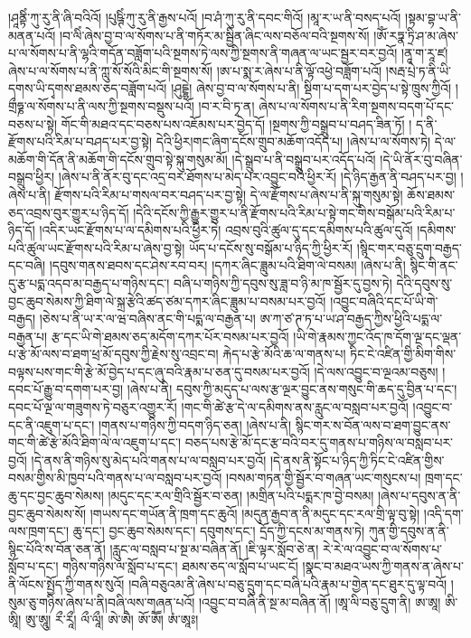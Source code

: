 །ཤཱནྟིཾ་ཀུ་རུ་ནི་ཞི་བའིའོ། །པུཥྚིཾ་ཀུ་རུ་ནི་རྒྱས་པའོ། །བ་ཤཾ་ཀུ་རུ་ནི་དབང་གིའོ། །མཱ་ར་ཡ་ནི་བསད་པའོ། །སྟམ་བྷ་ཡ་ནི་མནན་པའོ། །བ་ལིཾ་ཞེས་བྱ་བ་ལ་སོགས་པ་ནི་གཏོར་མ་སྦྱིན་ཞིང་ལས་བཅོལ་བའི་སྔགས་སོ། །ཨོཾ་རཏྣ་ཏྲི་ཤ་མ་ཞེས་པ་ལ་སོགས་པ་ནི་ལྷའི་གདོན་བཟློག་པའི་སྔགས་ཏེ་ལས་ཀྱི་སྔགས་ནི་གཞན་ལ་ཡང་སྦྱར་བར་བྱའོ། །ནཱ་ག་རཱ་ཛ། ཞེས་པ་ལ་སོགས་པ་ནི་ཀླུ་སོ་སོའི་མིང་གི་སྔགས་སོ། །ཨ་པ་སྨ་ར་ཞེས་པ་ནི་ལྟོ་འཕྱེ་བཟློག་པའོ། །སརྦ་པྲེ་ཏ་ནི་{ཡི་དགས་ཡི་དྭགས་}ཐམས་ཅད་བཟློག་པའོ། །ཤུདྔྷེ། ཞེས་བྱ་བ་ལ་སོགས་པ་ནི། སྡིག་པ་དག་པར་བྱེད་པ་སྟེ་ཁྲུས་ཀྱིའོ། །གྲྀཧྞ་ལ་སོགས་པ་ནི་ལས་ཀྱི་སྔགས་བསྡུས་པའོ། །བ་ར་བི་ཏྭ་ན། ཞེས་པ་ལ་སོགས་པ་ནི་རིག་སྔགས་བདག་པོ་དང་བཅས་པ་སྟེ། གོང་གི་མཐའ་དང་བཅས་པས་འཇོམས་པར་བྱེད་དོ། །སྔགས་ཀྱི་བསྒྲུབ་པ་བཤད་ཟིན་ཏོ། །
ད་ནི་རྫོགས་པའི་རིམ་པ་བཤད་པར་བྱ་སྟེ། དེའི་ཕྱིར།གང་ཞིག་དངོས་གྲུབ་མཆོག་འདོད་པ། །ཞེས་པ་ལ་སོགས་ཏེ། དེ་ལ་མཆོག་གི་དོན་ནི་མཆོག་གི་དངོས་གྲུབ་སྟེ་སྐུ་གསུམ་མོ། །དེ་སྒྲུབ་པ་ནི་བསྒྲུབ་པར་འདོད་པའོ། །དེ་ཡི་ནོར་བུ་བཞིན་བསྒྲུབ་ཕྱིར། །ཞེས་པ་ནི་ནོར་བུ་དང་འདྲ་བར་ཐོགས་པ་མེད་པར་འབྱུང་བའི་ཕྱིར་རོ། །དེ་ཉིད་རྒྱན་ནི་བཤད་པར་བྱ། །ཞེས་པ་ནི། རྫོགས་པའི་རིམ་པ་གསལ་བར་བཤད་པར་བྱ་སྟེ། དེ་ལ་རྫོགས་པ་ཞེས་པ་ནི་སྐུ་གསུམ་སྟེ། ཆོས་ཐམས་ཅད་འབྲས་བུར་གྱུར་པ་ཉིད་དོ། །དེའི་དངོས་ཀྱི་རྒྱུར་གྱུར་པ་ནི་རྫོགས་པའི་རིམ་པ་སྟེ་གང་གིས་བསྒོམ་པའི་རིམ་པ་ཉིད་དོ། །འདིར་ཡང་རྫོགས་པ་ལ་དམིགས་པའི་ཕྱིར་ཏེ། འབྲས་བུའི་ཚུལ་དུ་དང་དམིགས་པའི་ཚུལ་དུའོ། །དམིགས་པའི་ཚུལ་ཡང་རྫོགས་པའི་རིམ་པ་ཞེས་བྱ་སྟེ། ཡོད་པ་དངོས་སུ་བསྒོམ་པ་ཉིད་ཀྱི་ཕྱིར་རོ། །སྙིང་གར་བཅུ་དྲུག་བརྒྱད་དང་བཞི། །དབུས་གནས་ཐབས་དང་ཤེས་རབ་བར། །དཀར་​ ཞིང་ཟླུམ་པའི་ཐིག་ལེ་བསམ། །ཞེས་པ་ནི། སྙིང་གི་ནང་དུ་རྩ་པདྨ་འདབ་མ་བརྒྱད་པ་གཉིས་དང་། བཞི་པ་གཉིས་ཀྱི་དབུས་སུ་ཟླ་བ་ཉི་མ་ཁ་སྦྱོར་དུ་བྱས་ཏེ། དེའི་དབུས་སུ་བྱང་ཆུབ་སེམས་ཀྱི་ཐིག་ལེ་སྐྲ་རྩེའི་ཚད་ཙམ་དཀར་ཞིང་ཟླུམ་པ་བསམ་པར་བྱའོ། །འབྱུང་བཞིའི་དང་པོ་ཡི་གེ་བརྒྱད། །ཅེས་པ་ནི་ཡ་ར་ལ་ཝ་བཞིས་ནང་གི་པདྨ་ལ་བརྒྱན་པ། ཨ་ཀ་ཙ་ཊ་ཏ་པ་ཡ་ཤ་བརྒྱད་ཀྱིས་ཕྱིའི་པདྨ་ལ་བརྒྱན་པ། རྩ་དང་ཡི་གེ་ཐམས་ཅད་མདོག་དཀར་པོར་བསམ་པར་བྱའོ། །ཡི་གེ་རྣམས་ཀྱང་འོད་ཁ་དོག་ལྔ་དང་ལྡན་པ་རྩེ་མོ་ལས་བ་ཐག་ཕྲ་མོ་དབུས་ཀྱི་རྗེས་སུ་འབྲང་བ། རྐེད་པ་རྩེ་མོའི་ཆ་ལ་གནས་པ། ཏིང་ངེ་འཛིན་གྱི་མིག་གིས་བལྟས་པས་གང་གི་རྩེ་མོ་བྱེད་པ་དང་ཞུ་བའི་རྣམ་པ་ཅན་དུ་བསམ་པར་བྱའོ། །དེ་ལས་འབྱུང་བ་ལྔའམ་བཅུས། །དབང་པོ་རྒྱུ་བ་དགག་པར་བྱ། །ཞེས་པ་ནི། དབུས་ཀྱི་མདུད་པ་ལས་རྩ་ལྔར་བྱུང་ནས་གསུང་གི་ཆད་དུ་བྱིན་པ་དང་། དབང་པོ་ལྔ་ལ་གཟུགས་ཏེ་བཅུར་འགྱུར་རོ། །གང་གི་ཚེ་རྩ་དེ་ལ་དམིགས་ནས་རླུང་ལ་བསླབ་པར་བྱའོ། །འབྱུང་བ་དང་ནི་འཇུག་པ་དང་། །གནས་པ་གཉིས་ཀྱི་བདག་ཉིད་ཅན། །ཞེས་པ་ནི། སྙིང་གར་ས་བོན་ལས་བ་ཐག་བྱུང་ནས་གང་གི་ཚེ་རྩེ་མོའི་ཐིག་ལེ་ལ་འཇུག་པ་དང་། བཅད་པས་རྩེ་མོ་དང་རྩ་བའི་བར་དུ་གནས་པ་གཉིས་ལ་བསླབ་པར་བྱའོ། །དེ་ནས་ནི་གཉིས་སུ་མེད་པའི་གནས་པ་ལ་བསླབ་པར་བྱའོ། །དེ་ནས་ནི་སྟོང་པ་ཉིད་ཀྱི་ཏིང་ངེ་འཛིན་གྱིས་བསམ་གྱིས་མི་ཁྱབ་པའི་གནས་པ་ལ་བསླབ་པར་བྱའོ། །བསམ་གཏན་གྱི་སྦྱོར་བ་གཞན་ཡང་གསུངས་པ། ཁྲག་དང་ཆུ་དང་བྱང་ཆུབ་སེམས། །མདུང་དང་རལ་གྲིའི་སྦྱོར་བ་ཅན། །མགྲིན་པའི་པདྨར་ཁ་བྱེ་བསམ། །ཞེས་པ་དབུས་ན་ནི་བྱང་ཆུབ་སེམས་སོ། །གཡས་དང་གཡོན་ནི་ཁྲག་དང་ཆུའོ། །མདུན་རྒྱབ་ན་ནི་མདུང་དང་རལ་གྲི་ལྟ་བུ་སྟེ། །འདི་དག་ལས་ཁྲག་དང་། ཆུ་དང་། བྱང་ཆུབ་སེམས་དང་། དབུགས་དང་། དྲོད་ཀྱི་དངས་མ་གནས་ཏེ། ཀུན་གྱི་དབུས་ན་ནི་སྙིང་པོའི་ས་བོན་ཅན་ནོ། །རླུང་ལ་བསླབ་པ་སྔ་མ་བཞིན་ནོ། །ཇི་ལྟར་སློབ་ཅེ་ན། རེ་རེ་ལ་འབྱུང་བ་ལ་སོགས་པ་​ སློབ་པ་དང་། གཉིས་གཉིས་ལ་སློབ་པ་དང་། ཐམས་ཅད་ལ་སློབ་པ་ཡང་ངོ། །སྣང་བ་མཐའ་ཡས་ཀྱི་གནས་ན་ཞེས་པ་ནི་ལོངས་སྤྱོད་ཀྱི་གནས་སུའོ། །བཞི་བཅུའམ་ནི་ཞེས་པ་བཅུ་དྲུག་དང་བཞི་པའི་རྣམ་པ་གྱེན་དང་ཐུར་དུ་ལྟ་བའོ། །སུམ་ཅུ་གཉིས་ཞེས་པ་ནི།བཞི་ལས་གཞན་པའོ། །འབྱུང་བ་བཞི་ནི་སྔ་མ་བཞིན་ནོ། །ཨཱ་ལི་བཅུ་དྲུག་ནི། ཨ་ཨཱ། ཨི་ཨཱི། ཨུ་ཨཱུ། རྀ་རཱྀ། ལྀ་ལཱྀ། ཨེ་ཨཻ། ཨོ་ཨཽ། ཨཾ་ཨཱཿ། 
